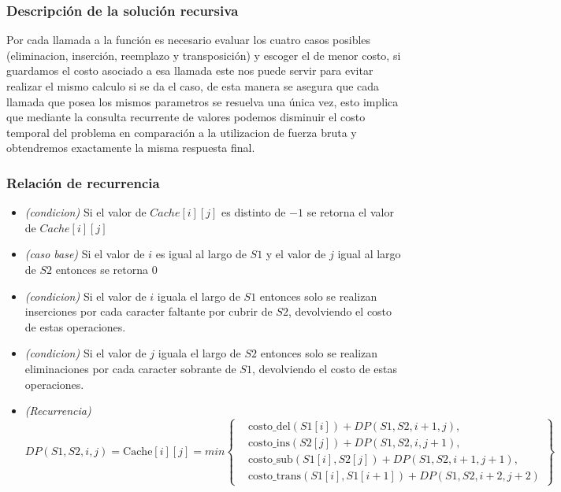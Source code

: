 
\subsubsection{Descripción de la solución recursiva}
    
    Por cada llamada a la función es necesario evaluar los cuatro casos posibles (eliminacion, inserción, reemplazo y transposición) y escoger el de menor costo,
    si guardamos el costo asociado a esa llamada este nos puede servir para evitar realizar el mismo calculo si se da el caso, de esta manera se asegura que cada llamada
    que posea los mismos parametros se resuelva una única vez, esto implica que mediante la consulta recurrente de valores podemos
    disminuir el costo temporal del problema en comparación a la utilizacion de fuerza bruta y obtendremos exactamente la misma respuesta final. 
    

\subsubsection{Relación de recurrencia}
    
    \begin{itemize}
        \item \textit{(condicion)} Si el valor de $Cache[i][j]$ es distinto de $-1$ se retorna el valor de $Cache[i][j]$ 
        \item \textit{(caso base)} Si el valor de $i$ es igual al largo de $S1$ y el valor de $j$ igual al largo de $S2$ entonces se retorna 0 
        \item \textit{(condicion)} Si el valor de $i$ iguala el largo de $S1$ entonces solo se realizan inserciones por cada caracter faltante por cubrir de $S2$, devolviendo el costo de estas operaciones.
        \item \textit{(condicion)} Si el valor de $j$ iguala el largo de $S2$ entonces solo se realizan eliminaciones por cada caracter sobrante de $S1$, devolviendo el costo de estas operaciones.
        \item \textit{(Recurrencia)}
                \[
                DP(S1, S2, i, j) = \text{Cache}[i][j] = min
                \left\{
                \begin{aligned}
                    &\text{costo\_del}(S1[i]) + DP(S1, S2, i+1, j), \\[0.5em]
                    &\text{costo\_ins}(S2[j]) + DP(S1, S2, i, j+1), \\[0.5em]
                    &\text{costo\_sub}(S1[i], S2[j]) + DP(S1, S2, i+1, j+1), \\[0.5em]
                    &\text{costo\_trans}(S1[i], S1[i+1]) + DP(S1, S2, i+2, j+2)
                \end{aligned}
                \right\}
                \]
    \end{itemize}
    

